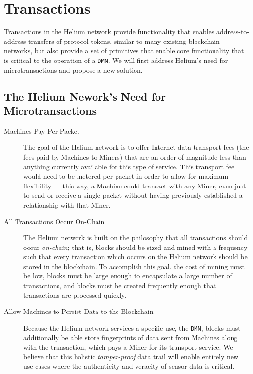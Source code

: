 \documentclass[10pt, nonatbib, nocopyrightspace, reprint]{sigplanconf}
\begin{document}
\section{Transactions}\label{transactions}

Transactions in the Helium network provide functionality that enables address-to-address transfers of protocol tokens, similar to many existing blockchain networks, but also provide a set of primitives that enable core functionality that is critical to the operation of a \verb|DMN|. We will first address Helium's need for microtransactions and propose a new solution.

\subsection{The Helium Nework's Need for Microtransactions}

\begin{description}

\item [Machines Pay Per Packet] The goal of the Helium network is to offer Internet data transport fees (the fees paid by Machines to Miners) that are an order of magnitude less than anything currently available for this type of service. This transport fee would need to be metered per-packet in order to allow for maximum flexibility --- this way, a Machine could transact with any Miner, even just to send or receive a single packet without having previously established a relationship with that Miner.

\item [All Transactions Occur On-Chain] The Helium network is built on the philosophy that all transactions should occur \emph{on-chain}; that is, blocks should be sized and mined with a frequency such that every transaction which occurs on the Helium network should be stored in the blockchain.  To accomplish this goal, the cost of mining must be low, blocks must be large enough to encapsulate a large number of transactions, and blocks must be created frequently enough that transactions are processed quickly.

\item [Allow Machines to Persist Data to the Blockchain] Because the Helium network services a specific use, the \verb|DMN|, blocks must additionally be able store fingerprints of data sent from Machines along with the transaction, which pays a Miner for its transport service.  We believe that this holistic \emph{tamper-proof} data trail will enable entirely new use cases where the authenticity and veracity of sensor data is critical.

\end{description}
\end{document}
